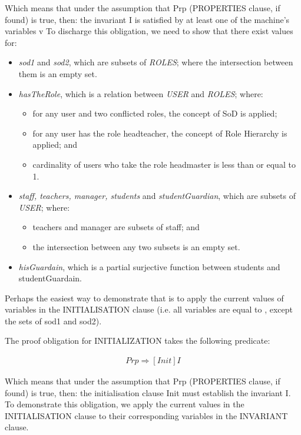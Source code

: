       Which means that under the assumption that Prp (PROPERTIES clause, if found) is true, then: the invariant I is satisfied by at least one of the machine’s variables v
     To discharge this obligation, we need to show that there exist values for:
\begin{itemize}
\item \emph{sod1} and \emph{sod2}, which are subsets of \emph{ROLES}; where the intersection between them is an empty set.
\item	\emph{hasTheRole}, which is a relation between \emph{USER} and \emph{ROLES}; where:
\begin{itemize}
\item for any user and two conflicted roles, the concept of SoD is applied;
\item for any user has the role headteacher, the concept of Role Hierarchy is applied; and
\item cardinality of users who take the role headmaster is less than or equal to 1. 
\end{itemize}
\item	\emph{staff, teachers, manager, students} and \emph{studentGuardian}, which are subsets of \emph{USER}; where:
\begin{itemize}
\item	teachers and manager are subsets of staff; and
\item	the intersection between any two subsets is an empty set.
\end{itemize}
\item \emph{hisGuardain}, which is a partial surjective function between students and studentGuardain.

\end{itemize}

Perhaps the easiest way to demonstrate that is to apply the current values of variables in the INITIALISATION clause (i.e. all variables are equal to { }, except the sets of sod1 and sod2).  

      
      The proof obligation for INITIALIZATION takes the following predicate: 

\begin{align*}
Prp \Rightarrow[Init] I
\end{align*}



Which means that under the assumption that Prp (PROPERTIES clause, if found) is true, then: the initialisation clause Init must establish the invariant I.  To demonstrate this obligation, we apply the current values in the INITIALISATION clause to their corresponding variables in the INVARIANT clause.

